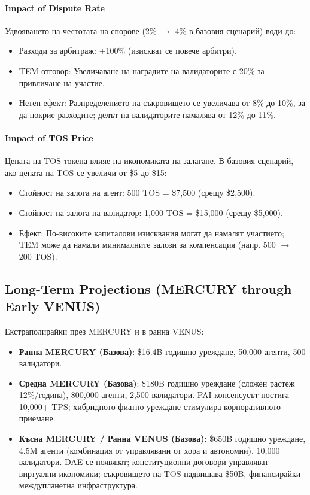 \documentclass[11pt]{article}
\begin{document}
\paragraph{Impact of Dispute Rate}
Удвояването на честотата на спорове (2\% $\to$ 4\% в базовия сценарий) води до:
\begin{itemize}[noitemsep]
  \item Разходи за арбитраж: +100\% (изискват се повече арбитри).
  \item TEM отговор: Увеличаване на наградите на валидаторите с 20\% за привличане на участие.
  \item Нетен ефект: Разпределението на съкровището се увеличава от 8\% до 10\%, за да покрие разходите; делът на валидаторите намалява от 12\% до 11\%.
\end{itemize}

\paragraph{Impact of TOS Price}
Цената на TOS токена влияе на икономиката на залагане. В базовия сценарий, ако цената на TOS се увеличи от \$5 до \$15:
\begin{itemize}[noitemsep]
  \item Стойност на залога на агент: 500 TOS = \$7{,}500 (срещу \$2{,}500).
  \item Стойност на залога на валидатор: 1,000 TOS = \$15{,}000 (срещу \$5{,}000).
  \item Ефект: По-високите капиталови изисквания могат да намалят участието; TEM може да намали минималните залози за компенсация (напр. 500 $\to$ 200 TOS).
\end{itemize}

\subsection{Long-Term Projections (MERCURY through Early VENUS)}
Екстраполирайки през MERCURY и в ранна VENUS:
\begin{itemize}[noitemsep]
  \item \textbf{Ранна MERCURY (Базова)}: \$16.4B годишно уреждане, 50,000 агенти, 500 валидатори.
  \item \textbf{Средна MERCURY (Базова)}: \$180B годишно уреждане (сложен растеж 12\%/година), 800,000 агенти, 2,500 валидатори. PAI консенсусът постига 10,000+ TPS; хибридното фиатно уреждане стимулира корпоративното приемане.
  \item \textbf{Късна MERCURY / Ранна VENUS (Базова)}: \$650B годишно уреждане, 4.5M агенти (комбинация от управлявани от хора и автономни), 10,000 валидатори. DAE се появяват; конституционни договори управляват виртуални икономики; съкровището на TOS надвишава \$50B, финансирайки междупланетна инфраструктура.
\end{itemize}
\end{document}
